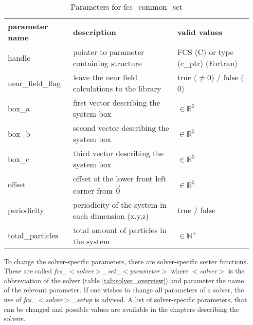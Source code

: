 \begin{table}
\begin{center}
\begin{tabular}{|p{}|p{}|p{}|}
          \hline
          parameter name        &       description                                         &   valid values                        \\
          \hline
          handle                &       pointer to parameter containing structure           &   FCS (C) or type (c\_ptr) (Fortran)   \\
          \hline
          near\_field\_flag    &       leave the near field calculations to the library    &   true ($\neq 0$) / false ($0$)       \\
          \hline
          box\_a                &       first vector describing the system box              &   $\in \mathbb{R}^3$                  \\
          \hline
          box\_b                &       second vector describing the system box             &   $\in \mathbb{R}^3$                  \\
          \hline
          box\_c                &       third vector describing the system box              &   $\in \mathbb{R}^3$                  \\
          \hline
          offset                &       offset of the lower front left corner from $\vec{0}$&   $\in \mathbb{R}^3$                  \\
          \hline
          periodicity           &       periodicity of the system in each dimension (x,y,z) &   true / false                        \\
          \hline
          total\_particles      &       total amount of particles in the system             &   $\in \mathbb{N}^+$                  \\
          \hline 
\end{tabular}
\end{center}
\caption{Parameters for fcs\_common\_set}
\label{tab:fcs_set_common_parameters}
\end{table}

To change the solver-specific parameters, there are solver-specific setter functions. These are called \textit{fcs\_$<$solver$>$\_set\_$<$parameter$>$} where 
\textit{$<$solver$>$} is the abbreviation of the solver (table \ref{tab:solver_overview}) and parameter the name of the relevant parameter. If one wishes to change all parameters of
a solver, the use of \textit{fcs\_$<$solver$>$\_setup} is advised. A list of solver-specific parameters, that can be changed and possible values are available
in the chapters describing the solvers.

